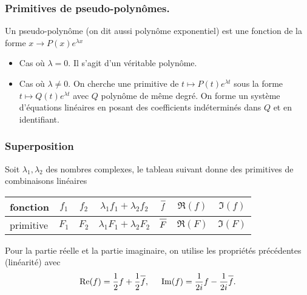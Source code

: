 \subsubsection{Primitives de pseudo-polynômes.}
Un pseudo-polynôme (on dit aussi polynôme exponentiel) est une fonction de la forme $x\rightarrow P(x)e^{\lambda x}$ 
\begin{itemize}
  \item Cas où $\lambda =0$. Il s'agit d'un véritable polynôme.
  \item Cas où $\lambda \neq 0$. On cherche une primitive de $t\mapsto P(t)e^{\lambda t}$ sous la forme $t\mapsto Q(t)e^{\lambda t}$ avec $Q$ polynôme de même degré. On forme un système d'équations linéaires en posant des coefficients indéterminés dans $Q$ et en identifiant.
\end{itemize}

\subsubsection{Superposition}
Soit $\lambda_1, \lambda_2$ des nombres complexes, le tableau suivant donne des primitives de combinaisons linéaires
\begin{center}
\renewcommand{\arraystretch}{1.5}
\begin{tabular}{|l|c|c|c|c|c|c|} \hline
fonction  & $f_1$ & $f_2$ & $\lambda_1 f_1 + \lambda_2 f_2$ & $\overline{f \strut}$ & $\Re(f)$ & $\Im(f)$ \\ \hline
primitive & $F_1$ & $F_2$ & $\lambda_1 F_1 + \lambda_2 F_2$ & $\overline{F\strut}$ & $\Re(F)$ & $\Im(F)$ \\ \hline
\end{tabular}
\end{center}
Pour la partie réelle et la partie imaginaire, on utilise les propriétés précédentes (linéarité) avec
\[
 \Re(f) = \frac{1}{2}f +  \frac{1}{2}\overline{f \strut} , \hspace{0.5cm} \Im(f) = \frac{1}{2i}f -  \frac{1}{2i}\overline{f \strut}.
\]

